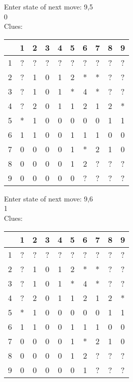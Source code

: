 Enter state of next move: 9,5\\
0\\
Clues:\\
\begin{tabular}{|c|c|c|c|c|c|c|c|c|c|}
\hline
  & 1 & 2 & 3 & 4 & 5 & 6 & 7 & 8 & 9\\
\hline
1 & ? & ? & ? & ? & ? & ? & ? & ? & ?\\
\hline
2 & ? & 1 & 0 & 1 & 2 & * & * & ? & ?\\
\hline
3 & ? & 1 & 0 & 1 & * & 4 & * & ? & ?\\
\hline
4 & ? & 2 & 0 & 1 & 1 & 2 & 1 & 2 & *\\
\hline
5 & * & 1 & 0 & 0 & 0 & 0 & 0 & 1 & 1\\
\hline
6 & 1 & 1 & 0 & 0 & 1 & 1 & 1 & 0 & 0\\
\hline
7 & 0 & 0 & 0 & 0 & 1 & * & 2 & 1 & 0\\
\hline
8 & 0 & 0 & 0 & 0 & 1 & 2 & ? & ? & ?\\
\hline
9 & 0 & 0 & 0 & 0 & 0 & ? & ? & ? & ?\\
\hline
\end{tabular}

Enter state of next move: 9,6\\
1\\
Clues:\\
\begin{tabular}{|c|c|c|c|c|c|c|c|c|c|}
\hline
  & 1 & 2 & 3 & 4 & 5 & 6 & 7 & 8 & 9\\
\hline
1 & ? & ? & ? & ? & ? & ? & ? & ? & ?\\
\hline
2 & ? & 1 & 0 & 1 & 2 & * & * & ? & ?\\
\hline
3 & ? & 1 & 0 & 1 & * & 4 & * & ? & ?\\
\hline
4 & ? & 2 & 0 & 1 & 1 & 2 & 1 & 2 & *\\
\hline
5 & * & 1 & 0 & 0 & 0 & 0 & 0 & 1 & 1\\
\hline
6 & 1 & 1 & 0 & 0 & 1 & 1 & 1 & 0 & 0\\
\hline
7 & 0 & 0 & 0 & 0 & 1 & * & 2 & 1 & 0\\
\hline
8 & 0 & 0 & 0 & 0 & 1 & 2 & ? & ? & ?\\
\hline
9 & 0 & 0 & 0 & 0 & 0 & 1 & ? & ? & ?\\
\hline
\end{tabular}

